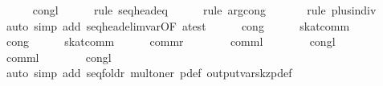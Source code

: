 \begin{isabellebody}
\ \ \ \ \isamarkupfalse%
\ congl\isanewline
\ \ \ \ \isamarkupfalse%
\ {}rule\ seq{}head{}eq{}\isanewline
\ \ \ \ \isamarkupfalse%
\ {}rule\ arg{}cong{}\ \isamarkupfalse%
\isanewline
\ \ \ \ \isamarkupfalse%
\ {}rule\ plus{}indiv{}{}\isanewline
\ \ \ \ \isamarkupfalse%
\ {}auto\ simp\ add{}\ seq{}head{}elim{}var{}OF\ a{}test{}{}\isanewline
\ \ \ \ \isamarkupfalse%
\ cong\isanewline
\ \ \ \ \isamarkupfalse%
\ skat{}comm\isanewline
\ \ \ \ \isamarkupfalse%
\ cong\isanewline
\ \ \ \ \isamarkupfalse%
\ skat{}comm\isanewline
\ \ \ \ \isamarkupfalse%
\ {}commr{}\ {}\ {}{}\isanewline
\ \ \ \ \isamarkupfalse%
\ {}comml{}\ {}\ {}{}\isanewline
\ \ \ \ \isamarkupfalse%
\ congl\isanewline
\ \ \ \ \isamarkupfalse%
\ {}comml{}\ {}\ {}{}\isanewline
\ \ \ \ \isamarkupfalse%
\ congl\isanewline
\ \ \ \ \isamarkupfalse%
\ {}auto\ simp\ add{}\ seq{}foldr\ mult{}oner\ p{}def\ output{}vars{}kzp{}def{}\isanewline
\ \ \ \ \isamarkupfalse%

\end{isabellebody}

